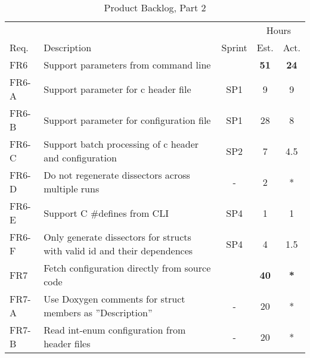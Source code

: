 \begin{table}[ht] \small \center
\caption{Product Backlog, Part 2 \label{tab:prodbacklog2}}
\begin{tabularx}{\textwidth}{l X c c c}
	\toprule
	& & & \multicolumn{2}{c}{Hours} \\
	\cmidrule(r){4-5}
	Req. & Description & Sprint & Est. & Act. \\
	\midrule	
	FR6 & Support parameters from command line & & \textbf{51} & \textbf{24}\\
	FR6-A & Support parameter for \Gls{c} \gls{header} file & SP1 & 9 & 9 \\
	FR6-B & Support parameter for configuration file & SP1 & 28 & 8 \\
	FR6-C & Support batch processing of \Gls{c} \gls{header} and configuration & SP2 & 7 & 4.5 \\
	FR6-D & Do not regenerate dissectors across multiple runs & - & 2 & *\\
	FR6-E & Support C \#defines from CLI & SP4 & 1 & 1 \\
	FR6-F & Only generate dissectors for structs with valid id and their dependences & SP4 & 4 & 1.5\\
    \addlinespace
	FR7 & Fetch configuration directly from source code & & \textbf{40} &  \textbf{*} \\
	FR7-A & Use Doxygen comments for struct members as ''Description'' & - & 20 & *\\
	FR7-B & Read int-enum configuration from header files & - & 20 & * \\
	\bottomrule
\end{tabularx}
\end{table}








